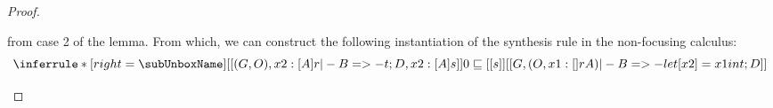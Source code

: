\begin{proof}
\begin{enumerate}
\begin{enumerate}
\[          \]
          from case 2 of the lemma. From which, we can construct the following instantiation of the \subUnboxName synthesis rule in the non-focusing calculus:
          \[
  \inferrule*[right=\subUnboxName]
    {[[ (G , O), x2 : [A] r |- B =>- t ; D, x2 : [A] s]]  \\ 0 \sqsubseteq [[s]]}{[[G , (O, x1 : [] r A) |- B =>- let [x2] = x1 in t ; D ]]}
          \]


\end{enumerate}
\end{enumerate}
\end{proof}
